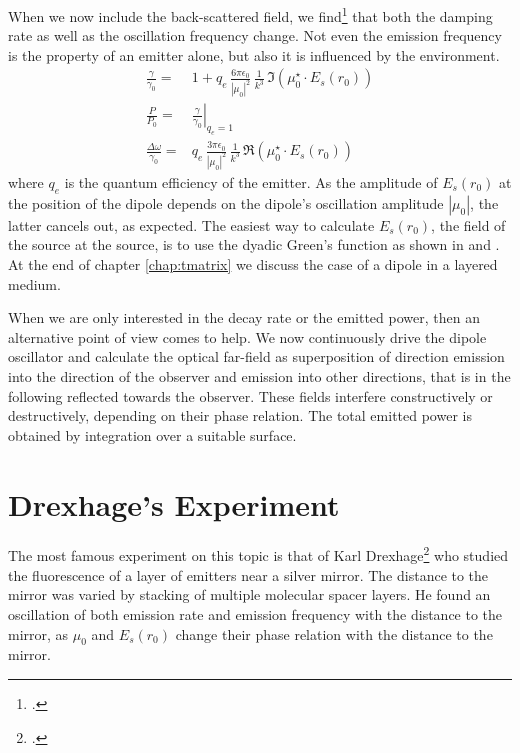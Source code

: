 When we now include the back-scattered field, we find\footcite[chapter 8.5.2]{Novotny-Hecht2012} that both the damping rate as well as the oscillation frequency change. Not even the emission frequency is the property of an emitter alone, but also it is influenced by the environment.
\begin{eqnarray}
 \frac{\gamma}{\gamma_0}  = &
  1 +  q_e \, \frac{6 \pi \epsilon_0}{|\mu_0|^2} \, \frac{1}{k^3} 
  \, \Im \left( \mu_0^\star \cdot E_s(r_0) \right) \\
 \frac{P}{P_0} =  &  \left. \frac{\gamma}{\gamma_0}  \right|_{q_e = 1} \\
 \frac{\Delta \omega}{\gamma_0} = &
 q_e \, \frac{3 \pi \epsilon_0}{|\mu_0|^2} \, \frac{1}{k^3} 
  \, \Re \left( \mu_0^\star \cdot E_s(r_0) \right)
\end{eqnarray}
where $q_e$ is the quantum efficiency of the emitter.
As the amplitude of $ E_s(r_0)$ at the position of the dipole depends on the dipole's oscillation amplitude $|\mu_0|$, the latter cancels out, as expected. The easiest way to calculate $ E_s(r_0)$, the field of the source at the source, is to use the dyadic Green's function as shown in \cite{Novotny-Hecht2012} and \cite{Hohenester2020}. At the end of chapter \ref{chap:tmatrix} we discuss the case of a dipole in a layered medium.


When we are only interested in the decay rate or the emitted power, then an alternative point of view comes to help. We now continuously drive the dipole oscillator and calculate the optical far-field as superposition of direction emission into the direction of the observer and emission into other directions, that is in the following reflected towards the observer. These fields interfere constructively or destructively, depending on their phase relation. The total emitted power is obtained by integration over a suitable surface.


\section{Drexhage's Experiment}

The most famous experiment on this topic is that of Karl Drexhage\footcite{Drexhage74} who studied the fluorescence of a layer of emitters near a silver mirror. The distance to the mirror was varied by stacking of multiple molecular spacer layers. He found an oscillation of both emission rate and emission frequency with the distance to the mirror, as $\mu_0$ and $E_s(r_0)$ change their phase relation with the distance to the mirror. 

